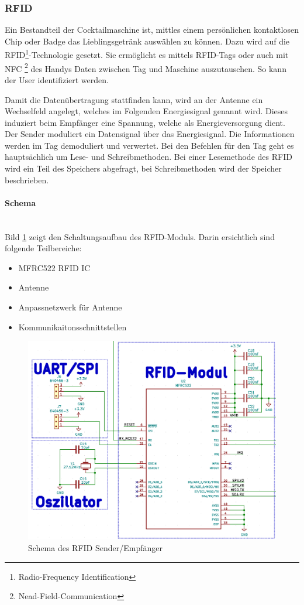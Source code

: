 \subsubsection{RFID}
\label{subsubsec:RFID}

Ein Bestandteil der Cocktailmaschine ist, mittles einem persönlichen kontaktlosen Chip oder Badge das Lieblingsgetränk auswählen zu können. Dazu wird auf die RFID\footnote{Radio-Frequency Identification}-Technologie gesetzt. Sie ermöglicht es mittels RFID-Tags oder auch mit NFC \footnote{Nead-Field-Communication} des Handys Daten zwischen Tag und Maschine auszutauschen. So kann der User identifiziert werden.

Damit die Datenübertragung stattfinden kann, wird an der Antenne ein Wechselfeld angelegt, welches im Folgenden Energiesignal genannt wird. Dieses induziert beim Empfänger eine Spannung, welche als Energieversorgung dient. Der Sender moduliert ein Datensignal über das Energiesignal. Die Informationen werden im Tag demoduliert und verwertet. Bei den Befehlen für den Tag geht es hauptsächlich um Lese- und Schreibmethoden. Bei einer Lesemethode des RFID wird ein Teil des Speichers abgefragt, bei Schreibmethoden wird der Speicher beschrieben.

\paragraph{Schema}\mbox{}\\

Bild \ref{fig:Schema_RFID} zeigt den Schaltungsaufbau des RFID-Moduls. Darin ersichtlich sind folgende Teilbereiche:

\begin{itemize}
\item MFRC522 RFID IC
\item Antenne
\item Anpassnetzwerk für Antenne
\item Kommunikaitonsschnittstellen
\end{itemize}

\begin{figure}[!h]
\center
\includegraphics[width = 0.6 \textwidth]{graphics/Schema_RFID}
\caption{Schema des RFID Sender/Empfänger}
\label{fig:Schema_RFID}
\end{figure}

